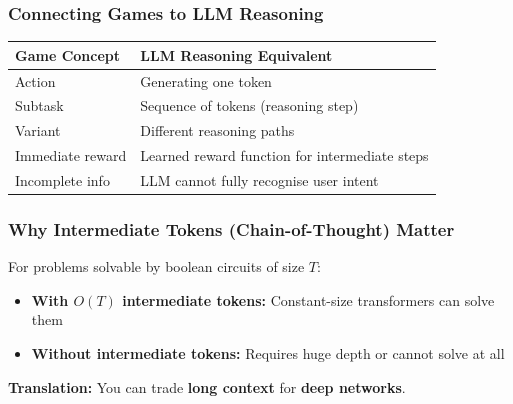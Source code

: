 \bigseparator

\subsubsection{Connecting Games to LLM Reasoning}

\begin{thmbox}
\begin{center}
\renewcommand{\arraystretch}{1.3}
\begin{tabular}{@{} l p{8cm} @{}}
\toprule
\textbf{Game Concept} & \textbf{LLM Reasoning Equivalent} \\
\midrule
Action & Generating one token \\
Subtask & Sequence of tokens (reasoning step) \\
Variant & Different reasoning paths \\
Immediate reward & Learned reward function for intermediate steps \\
Incomplete info & LLM cannot fully recognise user intent \\
\bottomrule
\end{tabular}
\end{center}
\end{thmbox}

\bigseparator

\subsubsection{Why Intermediate Tokens (Chain-of-Thought) Matter}

\begin{thmbox}
For problems solvable by boolean circuits of size $T$:
\begin{itemize}
  \item \textbf{With $O(T)$ intermediate tokens:} Constant-size transformers can solve them
  \item \textbf{Without intermediate tokens:} Requires huge depth or cannot solve at all
\end{itemize}

\textbf{Translation:} You can trade \textbf{long context} for \textbf{deep networks}.
\end{thmbox}


